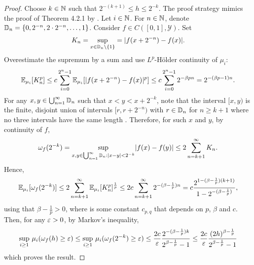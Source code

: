 \documentclass[12pt, twoside]{report}
\begin{document}
\begin{proof}
    Choose $k \in \mathbb{N}$ such that $2^{-(k + 1)} \le h \le 2^{-k}$.
    The proof strategy mimics the proof of Theorem 4.2.1 by \textcite{Norris:2018:Advanced_Probability}.
    Let $i \in \mathbb{N}$.
    For $n \in \mathbb{N}$, denote $\mathbb{D}_n = \{0, 2^{-n}, 2 \cdot 2^{-n}, \ldots, 1\}$.
    Consider $f \in C([0, 1], \mathcal{Y})$.
    Set
    \begin{equation}
        K_n = \operatorname*{sup}_{x \in \mathbb{D}_n \setminus \{1\}} = \lvert f(x + 2^{-n}) - f(x)\rvert.
    \end{equation}
    Overestimate the supremum by a sum and use $L^{p}$-H\"older continuity of $\mu_i$:
    \begin{equation}
         \mathbb{E}_{\mu_i}[K_n^p]
         \le c \sum_{i=0}^{2^n - 1} \mathbb{E}_{\mu_i}[\lvert f(x + 2^{-n}) - f(x)\rvert^p]
         \le c \sum_{i=0}^{2^n - 1} 2^{-\beta p n}
         = 2^{-(\beta p - 1) n}.
    \end{equation}
    For any $x, y \in \bigcup_{n=1}^\infty \mathbb{D}_n$ such that $x < y < x + 2^{-k}$, note that the interval $[x, y)$ is the finite, disjoint union of intervals $[r, r + 2^{-n})$ with $r \in \mathbb{D}_n$ for $n \ge k + 1$ where no three intervals have the same length \parencite[proof of Theorem 4.2.1;][]{Norris:2018:Advanced_Probability}.
    Therefore, for such $x$ and $y$, by continuity of $f$,
    \begin{equation}
        \omega_f(2^{-k})
        = \operatorname*{sup}_{x, y \in \bigcup_{n=1}^\infty \mathbb{D}_n: \lvert x - y\rvert< 2^{-k}}\lvert f(x) - f(y)\rvert
        \le 2\sum_{n=k+1}^\infty K_n.
    \end{equation}
    Hence,
    \begin{equation}
        \mathbb{E}_{\mu_i}[\omega_f(2^{-k})]
        \le 2\sum_{n=k+1}^\infty \mathbb{E}_{\mu_i}[K_n^p]^{\frac1p}
        \le 2c\sum_{n=k+1}^\infty 2^{-(\beta - \frac1p)n}
        = c\frac{2^{1-(\beta - \frac1p)(k + 1)}}{1 - 2^{-(\beta - \frac1p)}},
    \end{equation}
    using that $\beta - \frac1p > 0$,
    where
    is some constant $c_{p, q}$ that depends on $p$, $\beta$ and $c$. 
    Then, for any $\varepsilon > 0$, by Markov's inequality,
    \begin{equation}
        \operatorname*{sup}_{i \ge 1}\, \mu_i(\omega_f(h) \ge \varepsilon)
        \le \operatorname*{sup}_{i \ge 1}\, \mu_i(\omega_f(2^{-k}) \ge \varepsilon)
        \le \frac{2c}{\varepsilon} \frac{2^{-(\beta - \frac1p)k}}{2^{\beta - \frac1p} - 1}
        \le \frac{2c}{\varepsilon} \frac{(2h)^{\beta - \frac1p}}{2^{\beta - \frac1p} - 1}
    \end{equation}
    which proves the result.
\end{proof}
\end{document}
